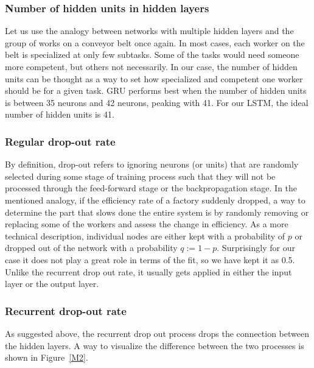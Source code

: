\documentclass[comsoc,conference]{IEEEtran}
\begin{document}

\subsubsection{Number of hidden units in hidden layers}

Let us use the analogy between networks with multiple hidden layers and the group of works on a conveyor belt once again. In most cases, each worker on the belt is specialized at only few subtasks. Some of the tasks would need someone more competent, but others not necessarily. In our case, the number of hidden units can be thought as a way to set how specialized and competent one worker should be for a given task. GRU performs best when the number of hidden units is between 35 neurons and 42 neurons, peaking with 41. For our LSTM, the ideal number of hidden units is 41.

\subsubsection{Regular drop-out rate}

By definition, drop-out refers to ignoring neurons (or units) that are randomly selected during some stage of training process such that they will not be processed through the feed-forward stage or the backpropagation stage. In the mentioned analogy, if the efficiency rate of a factory suddenly dropped, a way to determine the part that slows done the entire system is by randomly removing or replacing some of the workers and assess the change in efficiency. As a more technical description, individual nodes are either kept with a probability of $p$ or dropped out of the network with a probability $q:= 1-p$. Surprisingly for our case it does not play a great role in terms of the fit, so we have kept it as 0.5. Unlike the recurrent drop out rate, it usually gets applied in either the input layer or the output layer.


\subsubsection{Recurrent drop-out rate}

As suggested above, the recurrent drop out process drops the connection between the hidden layers. A way to visualize the difference between the two processes is shown in Figure~\ref{M2}. 
\end{document}
